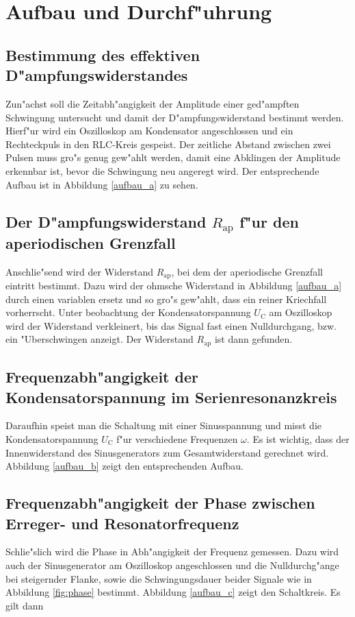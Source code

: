 \section{Aufbau und Durchf"uhrung}
	\label{sec:durchfuehrung}
	\subsection{Bestimmung des effektiven D"ampfungswiderstandes}
		Zun"achst soll die Zeitabh"angigkeit der Amplitude einer ged"ampften Schwingung untersucht und damit der D"ampfungswiderstand bestimmt werden.
		Hierf"ur wird ein Oszilloskop am Kondensator angeschlossen und ein Rechteckpuls in den RLC-Kreis gespeist.
		Der zeitliche Abstand zwischen zwei Pulsen muss gro"s genug gew"ahlt werden, damit eine Abklingen der Amplitude erkennbar ist, bevor die Schwingung neu angeregt wird.
		Der entsprechende Aufbau ist in Abbildung \ref{aufbau_a} zu sehen.

	\subsection{Der D"ampfungswiderstand $R_\mathrm{ap}$ f"ur den aperiodischen Grenzfall}
		Anschlie"send wird der Widerstand $R_\mathrm{ap}$, bei dem der aperiodische Grenzfall eintritt bestimmt.
		Dazu wird der ohmsche Widerstand in Abbildung \ref{aufbau_a} durch einen variablen ersetz und so gro"s gew"ahlt, dass ein reiner Kriechfall vorherrscht.
		Unter beobachtung der Kondensatorspannung $U_\mathrm{C}$ am Oszilloskop wird der Widerstand verkleinert, bis das Signal fast einen Nulldurchgang, bzw. ein "Uberschwingen anzeigt.
		Der Widerstand $R_\mathrm{ap}$ ist dann gefunden.

	\subsection{Frequenzabh"angigkeit der Kondensatorspannung im Serienresonanzkreis}
		Daraufhin speist man die Schaltung mit einer Sinusspannung und misst die Kondensatorspannung $U_\mathrm{C}$ f"ur verschiedene Frequenzen $\omega$.
		Es ist wichtig, dass der Innenwiderstand des Sinusgenerators zum Gesamtwiderstand gerechnet wird.
		Abbildung \ref{aufbau_b} zeigt den entsprechenden Aufbau.

	\subsection{Frequenzabh"angigkeit der Phase zwischen Erreger- und Resonatorfrequenz}
		Schlie"slich wird die Phase in Abh"angigkeit der Frequenz gemessen.
		Dazu wird auch der Sinusgenerator am Oszilloskop angeschlossen und die Nulldurchg"ange bei steigernder Flanke, sowie die Schwingungsdauer beider Signale wie in Abbildung \ref{fig:phase} bestimmt.
		Abbildung \ref{aufbau_c} zeigt den Schaltkreis.
		Es gilt dann

